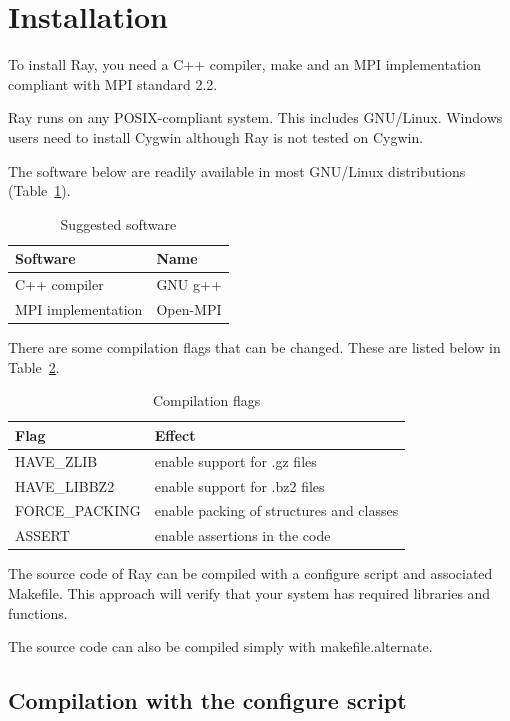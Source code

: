 \documentclass{article}
\begin{document}
\newpage
\tableofcontents
\newpage

\section{Installation}

To install Ray, you need a C++ compiler, make and an MPI implementation compliant
with MPI standard 2.2.

Ray runs on any POSIX-compliant system. This includes GNU/Linux.
Windows users need to install Cygwin although Ray is not tested on Cygwin.

The software below are readily available in most GNU/Linux distributions (Table~\ref{software}).

\begin{table}[h]
\caption{Suggested software}\label{software}
\begin{tabular}{ll}
\hline
Software & Name \\
\hline
C++ compiler & GNU g++ \\
MPI implementation & Open-MPI \\
\hline
\end{tabular}
\end{table}

There are some compilation flags that can be changed. These are listed below in Table~\ref{flags}.


\begin{table}[h]
\caption{Compilation flags}\label{flags}
\begin{tabular}{ll}
\hline
Flag & Effect  \\
\hline
HAVE\_ZLIB & enable support for .gz files \\
HAVE\_LIBBZ2 & enable support for .bz2 files \\
FORCE\_PACKING & enable packing of structures and classes\\
ASSERT & enable assertions in the code \\
\hline
\end{tabular}
\end{table}

The source code of Ray can be compiled with a configure script and associated Makefile.
This approach will verify that your system has required libraries and functions.

The source code can also be compiled simply with makefile.alternate.


\subsection{Compilation with the configure script}
\end{document}
